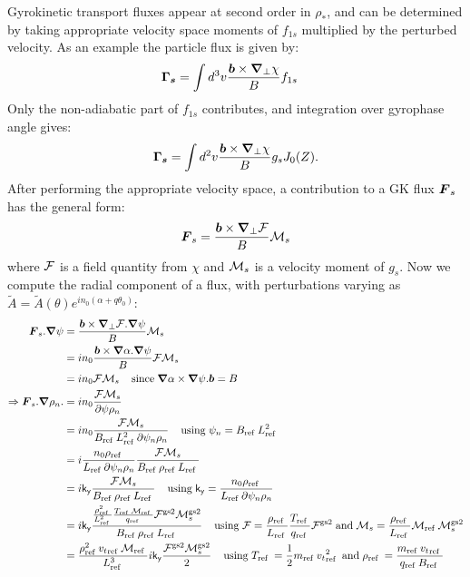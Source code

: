 \documentclass[10pt,a4paper]{article}
\newcommand{\dd}{\partial}
\newcommand{\grad}{{\bfm \nabla}}
\newcommand{\half}{\frac{1}{2}}
\newcommand{\bfm}[1]{\mbox{{\boldmath $ { #1}$}}}
\newcommand{\n}[1]{{#1}_{\rm ref\;}}
\newcommand{\g}[1]{\mathsf{#1}}
\begin{document}
Gyrokinetic transport fluxes appear at second order in $\rho_{\ast}$, and can
be determined by taking appropriate velocity space moments of $f_{1s}$
multiplied by the perturbed velocity.  As an example the particle flux is
given by:
\begin{align}
  \bfm{\Gamma_{s}} & = \int d^3v \frac{\bfm{b} \times \grad_{\perp} \chi }{B}
  f_{1s} \label{eq:GKflux}
\end{align}
Only the non-adiabatic part of $f_{1s}$ contributes, and integration over
gyrophase angle gives:
\begin{equation*}
\bfm{\Gamma_{s}}  = \int d^2v \frac{\bfm{b} \times \grad_{\perp} \chi }{B} g_s J_0(Z).
\end{equation*}
After performing the appropriate velocity space, a contribution to a GK flux
$\bfm{F}_s$ has the general form:
\begin{equation}
 \bfm{F}_s = \frac{\bfm{b} \times \grad_{\perp} {\cal F}}{B} {\cal M}_s
\end{equation}
where $\cal F$ is a field quantity from $\chi$ and ${\cal M}_s$ is a velocity
moment of $g_s$.  Now we compute the radial component of a flux, with
perturbations varying as $\tilde{A}=\tilde{A}(\theta) e^{i n_0 (\alpha + q
  \theta_0)}$:
\begin{align*}
  \bfm{F}_s. \grad \psi & = \frac{\bfm{b} \times \grad_{\perp} {\cal F}
    . \grad \psi }{B} {\cal M}_s \\
  & =  i n_0 \frac{\bfm{b} \times \grad \alpha . \grad \psi }{B} {\cal F} {\cal M}_s  \\
  & = i n_0 {\cal F} {\cal M}_s \;\;\;\;{\rm since}\; \grad{\alpha} \times
  \grad{\psi}. \bfm{b} = B\\
  \Rightarrow \bfm{F}_s.\grad \rho_n. & = i n_0 \frac{{\cal F} {\cal
      M}_s}{\dd{\psi}{\rho_n}}  \\
  & = i n_0 \frac{{\cal F} {\cal M}_s}{\n{B} \n{L}^2 \dd{\psi_n}{\rho_n}}
  \;\;\;\;{\rm using}\; \psi_n = \n{B} \n{L}^2 \\
  & = i \frac{n_0 \n{\rho}}{\n{L} \dd{\psi_n}{\rho_n} } \frac{{\cal F} {\cal
      M}_s}{\n{B} \n{\rho} \n{L}} \\
  & = i \g{k_y} \frac{{\cal F} {\cal M}_s}{\n{B} \n{\rho} \n{L}} \;\;\;\;{\rm
    using}\;  \g{k_y} = \frac{n_0 \n{\rho}}{\n{L} \dd{\psi_n}{\rho_n}} \\
  & = i \g{k_y} \frac{\frac{\n{\rho}^2}{\n{L}^2} \frac{\n{T} \n{\cal
        M}}{\n{q}} {\cal F}^{\rm gs2} {\cal M}_s^{\rm gs2}}{\n{B} \n{\rho}
    \n{L}} \;\;\;\;{\rm using}\; {\cal F} = \frac{\n{\rho}}{\n{L}}
  \frac{\n{T}}{\n{q}} {\cal F}^{\rm gs2}
  \;{\rm and}\; {\cal M}_s =  \frac{\n{\rho}}{\n{L}} \n{\cal M} {\cal M}_s^{\rm gs2} \\
  & = \frac{\n{\rho}^2 \n{v_t} \n{\cal M}}{\n{L}^3 } i \g{k_y} \frac{ {\cal
      F}^{\rm gs2} {\cal M}_s^{\rm gs2} }{2} \;\;\;\;{\rm using}\; \n{T}=
  \half \n{m}\n{v_t}^2 \; {\rm and} \; \n{\rho}=\frac{\n{m} \n{v_t}}{\n{q}
    \n{B}}
\end{align*}
\end{document}
